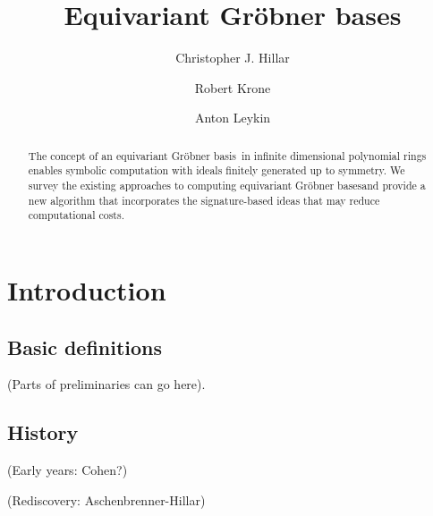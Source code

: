 \documentclass{amsart}
\theoremstyle{definition}
\theoremstyle{remark}
\numberwithin{equation}{section}
\newcommand{\GB}{{Gr\"obner basis}}
\newcommand{\GBs}{{Gr\"obner bases}}
\begin{document}
 \title{Equivariant Gr\"obner bases}

\author{Christopher J. Hillar}
\address{Redwood Center for Theoretical Neuroscience, University of California, Berkeley}

\author{Robert Krone}
\address{Georgia Tech University, Atlanta, GA}

\author{Anton Leykin}
\address{Georgia Tech University, Atlanta, GA}


%





\begin{abstract}
The concept of an equivariant \GB\ in infinite dimensional polynomial rings enables symbolic computation with ideals finitely generated up to symmetry. We survey the existing approaches to computing equivariant \GBs and provide a new algorithm that incorporates the signature-based ideas that may reduce computational costs.
\end{abstract} 

\maketitle 
\tableofcontents
\section{Introduction}
 
\subsection{Basic definitions}

(Parts of preliminaries can go here).

\subsection{History}

(Early years: Cohen?)

(Rediscovery: Aschenbrenner-Hillar)
\end{document}
